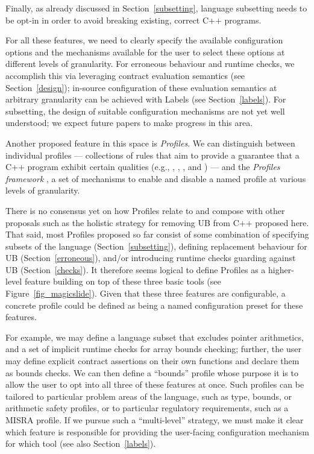{Finally, as already discussed in Section~\ref{subsetting}, language subsetting needs to be opt-in in order to avoid breaking existing, correct C++ programs.

For all these features, we need to clearly specify the available configuration options and the mechanisms available for the user to select these options at different levels of granularity. For erroneous behaviour and runtime checks, we accomplish this via leveraging contract evaluation semantics (see Section~\ref{design}); in-source configuration of these evaluation semantics at arbitrary granularity can be achieved with Labels (see Section~\ref{labels}). For subsetting, the design of suitable configuration mechanisms are not yet well understood; we expect future papers to make progress in this area.

Another proposed feature in this space is \emph{Profiles}. We can distinguish between individual profiles --- collections of rules that aim to provide a guarantee that a C++ program exhibit certain qualities (e.g., \cite{P3081R2}, \cite{P3038R0}, \cite{P3402R3}, and \cite{P3446R0}) --- and the \emph{Profiles framework} \cite{P3589R2}, a set of mechanisms to enable and disable a named profile at various levels of granularity.

There is no consensus yet on how Profiles relate to and compose with other proposals such as the holistic strategy for removing UB from C++ proposed here. That said, most Profiles proposed so far consist of some combination of specifying subsets of the language (Section~\ref{subsetting}), defining replacement behaviour for UB (Section~\ref{erroneous}), and/or introducing runtime checks guarding against UB (Section~\ref{checks}). It therefore seems logical to define Profiles as a higher-level feature building on top of these three basic tools (see Figure~\ref{fig_magicslide}). Given that these three features are configurable, a concrete profile could be defined as being a named configuration preset for these features. 

For example, we may define a language subset that excludes pointer arithmetics, and a set of implicit runtime checks for array bounds checking; further, the user may define explicit contract assertions on their own functions and declare them as bounds checks. We can then define a ``bounds'' profile whose purpose it is to allow the user to opt into all three of these features at once. Such profiles can be tailored to particular problem areas of the language, such as type, bounds, or arithmetic safety profiles, or to particular regulatory requirements, such as a MISRA profile. If we pursue such a ``multi-level'' strategy, we must make it clear which feature is responsible for providing the user-facing configuration mechanism for which tool (see also Section~\ref{labels}).

}
